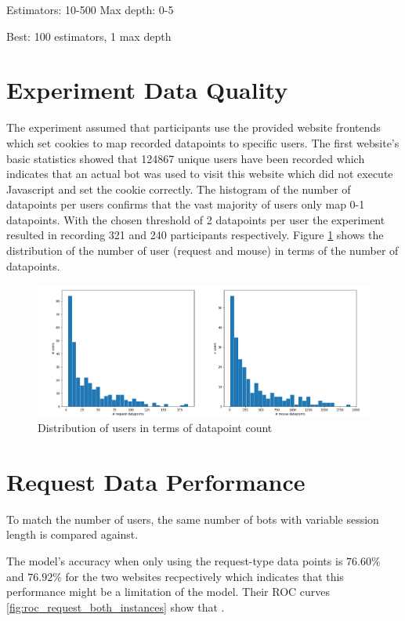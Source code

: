 \documentclass[
    fontsize=12pt,
    headings=small,
    parskip=half,           %
    bibliography=totoc,
    numbers=noenddot,       %
    open=any,               %
    final                   %
]{scrreprt}
\begin{document}
Estimators: 10-500
Max depth: 0-5

Best: 100 estimators, 1 max depth

\todo

\section{Experiment Data Quality}

The experiment assumed that participants use the provided website frontends which set cookies to map recorded datapoints to specific users. The first website's basic statistics showed that 124867 unique users have been recorded which indicates that an actual bot was used to visit this website which did not execute Javascript and set the cookie correctly. The histogram of the number of datapoints per users confirms that the vast majority of users only map 0-1 datapoints. With the chosen threshold of 2 datapoints per user the experiment resulted in recording 321 and 240 participants respectively. Figure \ref{fig:user_dp_hist} shows the distribution of the number of user (request and mouse) in terms of the number of datapoints.

\begin{figure}[h]
	\includegraphics[width=\textwidth]{figures/user_dp_hist.png}
	\caption{Distribution of users in terms of datapoint count}
	\label{fig:user_dp_hist}
\end{figure}



\section{Request Data Performance}

To match the number of users, the same number of bots with variable session length is compared against.

The model's accuracy when only using the request-type data points is $76.60\%$ and $76.92\%$ for the two websites recpectively which indicates that this performance might be a limitation of the model. Their ROC curves \ref{fig:roc_request_both_instances} show that .
\end{document}
